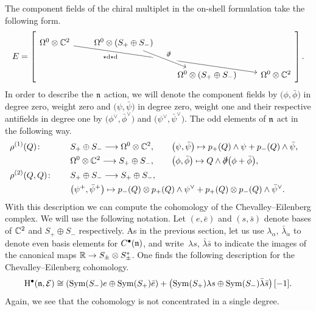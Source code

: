 \documentclass[pdftex]{sigma}
\numberwithin{equation}{section}
\def\cE{\mathcal E}\def\cF{\mathcal F}\def\cG{\mathcal G}\def\cH{\mathcal H}
\def\d{{\rm d}}
\DeclareMathOperator{\Sym}{Sym}
\begin{document}
The component fields of the chiral multiplet in the on-shell formulation take the following form.
\begin{equation*} \label{eq:chira on}
E= \left[\begin{tikzcd}[row sep=0.7cm, column sep=0.7cm]
\Omega^0 \otimes \CC^2 \arrow[drrr, "\star \d \star \d" ' near start] & \Omega^0 \otimes (S_+ \oplus S_-) \arrow[dr, crossing over, "\slashed{\partial}" ]\\
& & \Omega^0 \otimes (S_+ \oplus S_-) & \Omega^0 \otimes \CC^2
\end{tikzcd}\right].
\end{equation*}
In order to describe the $\mathfrak n$ action, we will denote the component fields by $\big(\phi, \bar{\phi}\big)$ in degree zero, weight zero and $\big(\psi,\bar{\psi}\big)$ in degree zero, weight one and their respective antifields in degree one by $\big(\phi^\vee, \bar{\phi}^\vee\big)$ and $\big(\psi^\vee,\bar{\psi}^\vee\big)$. The odd elements of $\mathfrak n$ act in the following way.
\begin{alignat*}{3}
& \rho^{(1)}(Q) \colon \quad && S_+ \oplus S_- \longrightarrow \Omega^0 \otimes \mathbb C^2 ,\qquad \big(\psi , \bar{\psi}\big) \mapsto p_+(Q) \wedge \psi + p_-(Q) \wedge \bar{\psi},&\\
&&& \Omega^0 \otimes\mathbb C^2 \longrightarrow S_+ \oplus S_- ,\qquad \big(\phi, \bar{\phi}\big) \mapsto Q \wedge \slashed{\partial} \big(\phi + \bar{\phi}\big), &\\
&\rho^{(2)}(Q,Q) \colon \quad&& S_+ \oplus S_- \longrightarrow S_+ \oplus S_- ,&\\
&&& \big(\psi^+, \bar{\psi}^+\big) \mapsto p_-(Q) \otimes p_+(Q) \wedge \psi^\vee + p_+(Q) \otimes p_-(Q) \wedge \bar{\psi}^\vee.&
\end{alignat*}
With this description we can compute the cohomology of the Chevalley--Eilenberg complex. We will use the following notation. Let $(e, \bar{e})$ and $(s,\bar{s})$ denote bases of $\mathbb C^2$ and $S_+ \oplus S_-$ respectively. As in the previous section, let us use $\lambda_\alpha$, $\bar \lambda_{\dot \alpha}$ to denote even basis elements for $C^\bullet(\mathfrak n)$, and write~$\lambda s$, $\bar \lambda \bar s$ to indicate the images of the canonical maps $\mathbb R \to S_\pm \otimes S_\pm^*$. One finds the following description for the Chevalley--Eilenberg cohomology.
\begin{equation*}
\mathrm H^\bullet(\fn, \cE) \cong \left(\Sym(S_-) e \oplus \Sym(S_+) \bar e\right) + \left(\Sym(S_+) \lambda s \oplus \Sym(S_-) \bar \lambda \bar s\right)[-1].
\end{equation*}
Again, we see that the cohomology is not concentrated in a single degree.
\end{document}
